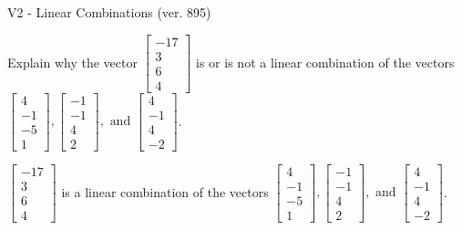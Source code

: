 \begin{exercise}
  \begin{exerciseTitle}V2 - Linear Combinations (ver. 895)\end{exerciseTitle}
  \begin{exerciseStatement}
    Explain why the vector \(\left[\begin{array}{c}
-17 \\
3 \\
6 \\
4
\end{array}\right]\)  is or is not a linear 
	combination of the vectors \(\left[\begin{array}{c}
4 \\
-1 \\
-5 \\
1
\end{array}\right] , \left[\begin{array}{c}
-1 \\
-1 \\
4 \\
2
\end{array}\right] , \text{ and } \left[\begin{array}{c}
4 \\
-1 \\
4 \\
-2
\end{array}\right]\).
	


  \end{exerciseStatement}
  \begin{exerciseAnswer}
   \(\left[\begin{array}{c}
-17 \\
3 \\
6 \\
4
\end{array}\right]\) 
  	 is  
	a linear combination of the vectors \(\left[\begin{array}{c}
4 \\
-1 \\
-5 \\
1
\end{array}\right] , \left[\begin{array}{c}
-1 \\
-1 \\
4 \\
2
\end{array}\right] , \text{ and } \left[\begin{array}{c}
4 \\
-1 \\
4 \\
-2
\end{array}\right]\).

	
  


  \end{exerciseAnswer}
\end{exercise}